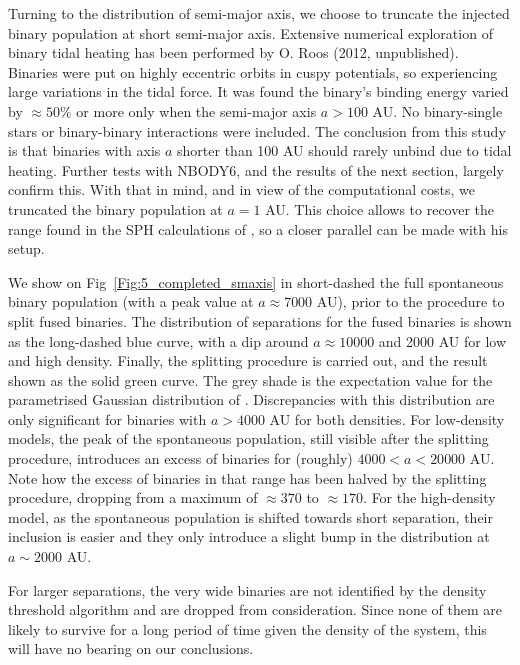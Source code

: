 Turning to the distribution of semi-major axis, we choose to truncate the injected binary population at short semi-major axis. Extensive numerical exploration of binary tidal heating has been performed by O. Roos (2012, unpublished). Binaries were put on highly eccentric orbits in cuspy \cite{Dehnen1993} potentials, so experiencing large variations in the tidal force. It was found the binary's binding energy varied by $ \approx 50\%$ or more only when the semi-major axis $a >  100$ AU. No binary-single stars or binary-binary interactions were included. The conclusion from this study is that binaries with axis $a$ shorter than 100 AU should rarely unbind due to tidal heating. Further tests with NBODY6, and the results of the next section, largely confirm this. With that in mind, and in view of the computational costs, we truncated the binary population at $a = 1$ AU. This choice allows to recover the range found in the SPH calculations of \cite{Bate2012}, so a closer parallel can be made with his setup. 


We show on Fig~\ref{Fig:5_completed_smaxis} in short-dashed  the full spontaneous binary population (with a peak value at $a \approx 7 000$ AU), prior to the procedure to split fused binaries. The distribution of separations for the fused binaries is shown as the long-dashed blue curve, with a dip around $ a \approx 10 000$ and 2000 AU for low and high density. Finally, the splitting procedure is carried out, and the result shown as the solid green curve. The grey shade is the expectation value for
the parametrised Gaussian distribution of \cite{Raghavan2010}. Discrepancies with this distribution are only significant for binaries with $a > 4 000$ AU for both densities. For low-density models, the peak of the spontaneous population, still visible after the splitting procedure, introduces an excess of binaries for (roughly)  $ 4 000 < a < 20 000 $ AU. Note how the excess of binaries in that range has been halved by the splitting procedure, dropping from a maximum of $\approx 370$ to $ \approx 170$. For the high-density model, as the spontaneous population is shifted towards short separation, their inclusion is easier and they only introduce a slight bump in the distribution at $ a \sim 2 000 $ AU.

 For larger separations, the very wide binaries are not identified by the density threshold algorithm and are dropped from consideration. Since none of them are likely to survive for a long period of time given the density of the system, this will have no bearing on our conclusions. 

